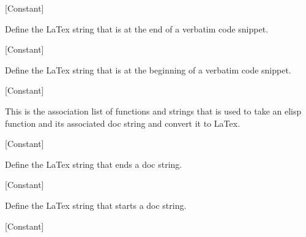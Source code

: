 \vspace{1em}
\noindent
{}
\usebox{\funcname}
 \hfill [Constant]

\begin{doc-string}
Define the LaTex string that is at the end of a verbatim
code snippet.
\end{doc-string}

\vspace{1em}
\noindent
{}
\usebox{\funcname}
 \hfill [Constant]

\begin{doc-string}
Define the LaTex string that is at the beginning of a verbatim
code snippet.
\end{doc-string}

\vspace{1em}
\noindent
{}
\usebox{\funcname}
 \hfill [Constant]

\begin{doc-string}
This is the association list of functions and strings that is used to take an elisp
function and its associated doc string and convert it to LaTex.
\end{doc-string}

\vspace{1em}
\noindent
{}
\usebox{\funcname}
 \hfill [Constant]

\begin{doc-string}
Define the LaTex string that ends a doc string.
\end{doc-string}

\vspace{1em}
\noindent
{}
\usebox{\funcname}
 \hfill [Constant]

\begin{doc-string}
Define the LaTex string that starts a doc string.
\end{doc-string}

\vspace{1em}
\noindent
{}
\usebox{\funcname}
 \hfill [Constant]

